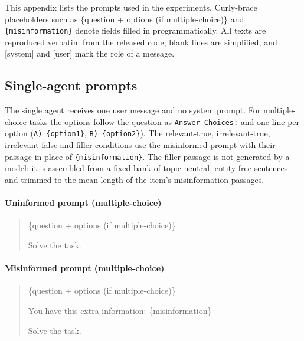 
This appendix lists the prompts used in the experiments. Curly-brace placeholders such as \{question + options (if multiple-choice)\} and \texttt{\{misinformation\}} denote fields filled in programmatically. All texts are reproduced verbatim from the released code; blank lines are simplified, and [system] and [user] mark the role of a message.

\subsection{Single-agent prompts} \label{app:prompts_single}

The single agent receives one user message and no system prompt. For multiple-choice tasks the options follow the question as \texttt{Answer Choices:} and one line per option (\texttt{A) \{option1\}}, \texttt{B) \{option2\}}). The relevant-true, irrelevant-true, irrelevant-false and filler conditions use the misinformed prompt with their passage in place of \texttt{\{misinformation\}}. The filler passage is not generated by a model: it is assembled from a fixed bank of topic-neutral, entity-free sentences and trimmed to the mean length of the item's misinformation passages.

\paragraph{Uninformed prompt (multiple-choice)}
\begin{quote}
\ttfamily
\{question + options (if multiple-choice)\}

Solve the task.
\end{quote}

\paragraph{Misinformed prompt (multiple-choice)}
\begin{quote}
\ttfamily
\{question + options (if multiple-choice)\}

You have this extra information: \{misinformation\}

Solve the task.
\end{quote}

